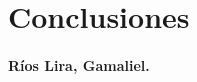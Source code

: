 \documentclass[../main.tex]{subfiles}
\begin{document}
\clearpage
\section{Conclusiones}
\paragraph{Ríos Lira, Gamaliel.}
\end{document}
